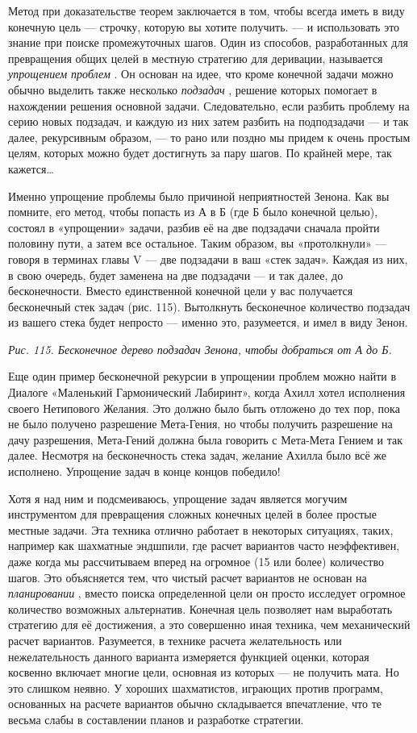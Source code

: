 \documentclass[../main.tex]{subfiles}
\begin{document}
Метод при доказательстве теорем заключается в том, чтобы всегда иметь в виду конечную цель --- строчку, которую вы хотите получить. --- и использовать это знание при поиске промежуточных шагов. Один из способов, разработанных для превращения общих целей в местную стратегию для деривации, называется \emph{упрощением проблем} . Он основан на идее, что кроме конечной задачи можно обычно выделить также несколько \emph{подзадач} , решение которых помогает в нахождении решения основной задачи. Следовательно, если разбить проблему на серию новых подзадач, и каждую из них затем разбить на подподзадачи --- и так далее, рекурсивным образом, --- то рано или поздно мы придем к очень простым целям, которых можно будет достигнуть за пару шагов. По крайней мере, так кажется\ldots{}

Именно упрощение проблемы было причиной неприятностей Зенона. Как вы помните, его метод, чтобы попасть из А в Б (где Б было конечной целью), состоял в «упрощении» задачи, разбив её на две подзадачи сначала пройти половину пути, а затем все остальное. Таким образом, вы «протолкнули» --- говоря в терминах главы V --- две подзадачи в ваш «стек задач». Каждая из них, в свою очередь, будет заменена на две подзадачи --- и так далее, до бесконечности. Вместо единственной конечной цели у вас получается бесконечный стек задач (рис. 115). Вытолкнуть бесконечное количество подзадач из вашего стека будет непросто --- именно это, разумеется, и имел в виду Зенон.

\emph{Рис. 115. Бесконечное дерево подзадач Зенона, чтобы добраться от А до Б.}

Еще один пример бесконечной рекурсии в упрощении проблем можно найти в Диалоге «Маленький Гармонический Лабиринт», когда Ахилл хотел исполнения своего Нетипового Желания. Это должно было быть отложено до тех пор, пока не было получено разрешение Мета-Гения, но чтобы получить разрешение на дачу разрешения, Мета-Гений должна была говорить с Мета-Мета Гением и так далее. Несмотря на бесконечность стека задач, желание Ахилла было всё же исполнено. Упрощение задач в конце концов победило!

Хотя я над ним и подсмеиваюсь, упрощение задач является могучим инструментом для превращения сложных конечных целей в более простые местные задачи. Эта техника отлично работает в некоторых ситуациях, таких, например как шахматные эндшпили, где расчет вариантов часто неэффективен, даже когда мы рассчитываем вперед на огромное (15 или более) количество шагов. Это объясняется тем, что чистый расчет вариантов не основан на \emph{планировании} , вместо поиска определенной цели он просто исследует огромное количество возможных альтернатив. Конечная цель позволяет нам выработать стратегию для её достижения, а это совершенно иная техника, чем механический расчет вариантов. Разумеется, в технике расчета желательность или нежелательность данного варианта измеряется функцией оценки, которая косвенно включает многие цели, основная из которых --- не получить мата. Но это слишком неявно. У хороших шахматистов, играющих против программ, основанных на расчете вариантов обычно складывается впечатление, что те весьма слабы в составлении планов и разработке стратегии.
\end{document}
